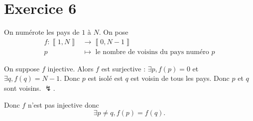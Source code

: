 \part{Exercice 6}

On numérote les pays de $1$ à $N$. On pose \begin{align*}
	f: \left\llbracket 1,N \right\rrbracket &\longrightarrow \left\llbracket 0, N - 1 \right\rrbracket \\
	p &\longmapsto \text{ le nombre de voisins du pays numéro } p
\end{align*}

On suppose $f$ injective. Alors $f$ est surjective : $\exists p, f(p) = 0$ et $\exists q, f(q) = N - 1$. Donc $p$ est isolé est $q$ est voisin de tous les pays. Donc $p$ et $q$ sont voisins. $\lightning$.

Donc $f$ n'est pas injective donc \[
	\exists p \neq q, f(p) = f(q).
\]

